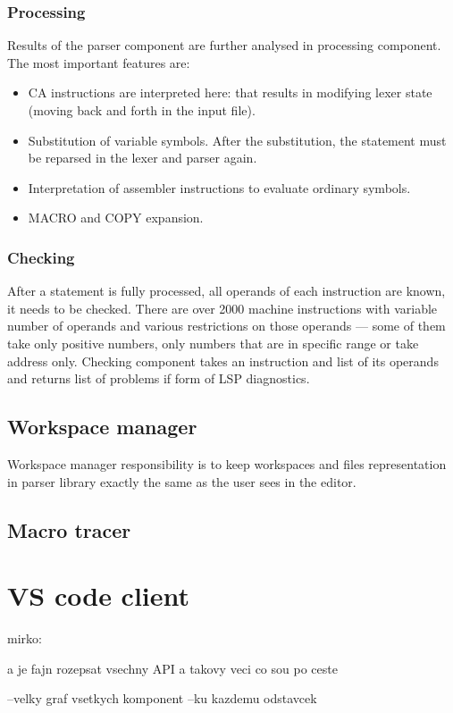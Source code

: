 \subsubsection{Processing}

Results of the parser component are further analysed in processing component. The most important features are:

\begin{itemize}
	\item CA instructions are interpreted here: that results in modifying lexer state (moving back and forth in the input file).
	\item Substitution of variable symbols. After the substitution, the statement must be reparsed in the lexer and parser again.
	\item Interpretation of assembler instructions to evaluate ordinary symbols.
	\item MACRO and COPY expansion.
\end{itemize}

\subsubsection{Checking}
After a statement is fully processed, all operands of each instruction are known, it needs to be checked. There are over 2000 machine instructions with variable number of operands and various restrictions on those operands --- some of them take only positive numbers, only numbers that are in specific range or take address only. Checking component takes an instruction and list of its operands and returns list of problems if form of LSP diagnostics.


\subsection{Workspace manager}

Workspace manager responsibility is to keep workspaces and files representation in parser library exactly the same as the user sees in the editor. 







\subsection{Macro tracer}



\section{VS code client}

mirko:

a je fajn rozepsat vsechny API a takovy veci co sou po ceste

--velky graf vsetkych komponent
--ku kazdemu odstavcek 